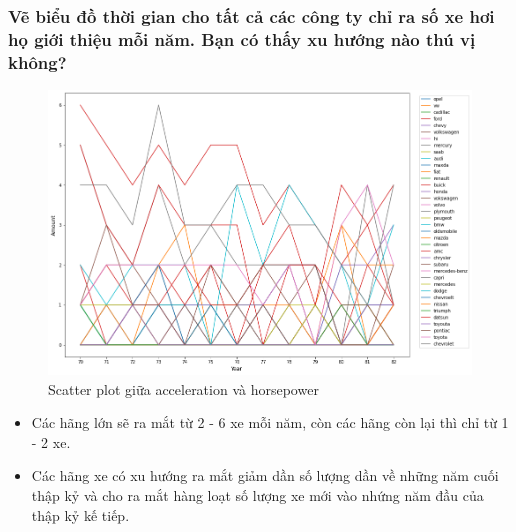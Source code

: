 \documentclass[a4paper, 12pt]{article}
\begin{document}
    \subsubsection{Vẽ biểu đồ thời gian cho tất cả các công ty chỉ ra số xe hơi họ giới thiệu mỗi năm. Bạn có thấy xu hướng nào thú vị không?}
        \begin{figure}[H]
            \centering
                \includegraphics[scale=0.5]{img/timeseries.png}
                \caption{Scatter plot giữa  acceleration và horsepower}
        \end{figure}
        
        \begin{itemize}
            \item Các hãng lớn sẽ ra mắt từ 2 - 6 xe mỗi năm, còn các hãng còn lại thì chỉ từ 1 - 2 xe.
            \item Các hãng xe có xu hướng ra mắt giảm dần số lượng dần về những năm cuối thập kỷ và cho ra mắt hàng loạt số lượng xe mới vào nhứng năm đầu của thập kỷ kế tiếp.
        \end{itemize}
\end{document}
